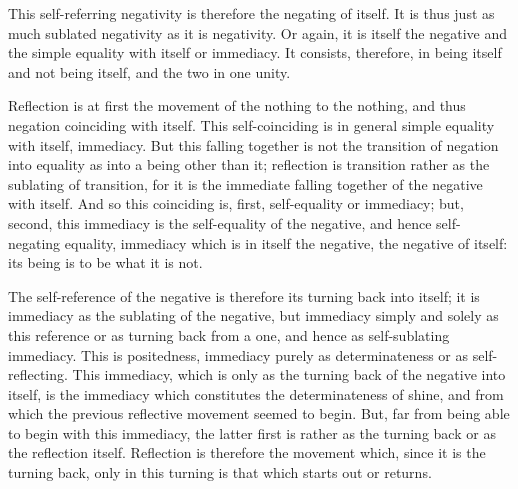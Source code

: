 This self-referring negativity is
therefore the negating of itself.
It is thus just as much
sublated negativity as it is negativity.
Or again, it is itself the negative
and the simple equality with itself or immediacy.
It consists, therefore, in being itself
and not being itself,
and the two in one unity.

Reflection is at first the movement of
the nothing to the nothing,
and thus negation coinciding with itself.
This self-coinciding is in general
simple equality with itself, immediacy.
But this falling together is not
the transition of negation into equality
as into a being other than it;
reflection is transition rather
as the sublating of transition,
for it is the immediate falling together
of the negative with itself.
And so this coinciding is, first,
self-equality or immediacy;
but, second, this immediacy is
the self-equality of the negative,
and hence self-negating equality,
immediacy which is in itself the negative,
the negative of itself:
its being is to be what it is not.

The self-reference of the negative is
therefore its turning back into itself;
it is immediacy as the sublating of the negative,
but immediacy simply and solely as this reference
or as turning back from a one,
and hence as self-sublating immediacy.
This is positedness,
immediacy purely as determinateness
or as self-reflecting.
This immediacy, which is only as
the turning back of the negative into itself,
is the immediacy which constitutes the determinateness of shine,
and from which the previous reflective movement seemed to begin.
But, far from being able to begin with this immediacy,
the latter first is rather as the turning back
or as the reflection itself.
Reflection is therefore the movement which,
since it is the turning back,
only in this turning is that
which starts out or returns.

